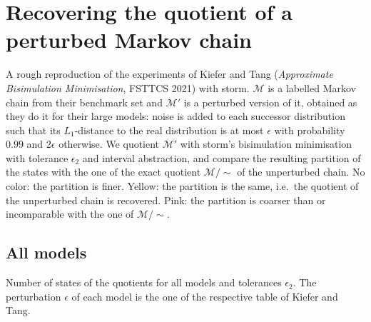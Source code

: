 \documentclass[a4paper]{article}
\begin{document}
\section*{Recovering the quotient of a perturbed Markov chain}
A rough reproduction of the experiments of Kiefer and Tang (\emph{Approximate Bisimulation Minimisation}, FSTTCS 2021) with storm. $\mathcal{M}$ is a labelled Markov chain from their benchmark set and $\mathcal{M}'$ is a perturbed version of it, obtained as they do it for their large models: noise is added to each successor distribution such that its $L_1$-distance to the real distribution is at most $\epsilon$ with probability $0.99$ and $2\epsilon$ otherwise. We quotient $\mathcal{M}'$ with storm's bisimulation minimisation with tolerance $\epsilon_2$ and interval abstraction, and compare the resulting partition of the states with the one of the exact quotient $\mathcal{M}/{\sim}$ of the unperturbed chain. No color: the partition is finer. \colorbox{recovered}{Yellow}: the partition is the same, i.e.\ the quotient of the unperturbed chain is recovered. \colorbox{notfiner}{Pink}: the partition is coarser than or incomparable with the one of $\mathcal{M}/{\sim}$.

\subsection*{All models}
Number of states of the quotients for all models and tolerances $\epsilon_2$. The perturbation $\epsilon$ of each model is the one of the respective table of Kiefer and Tang.
\end{document}
